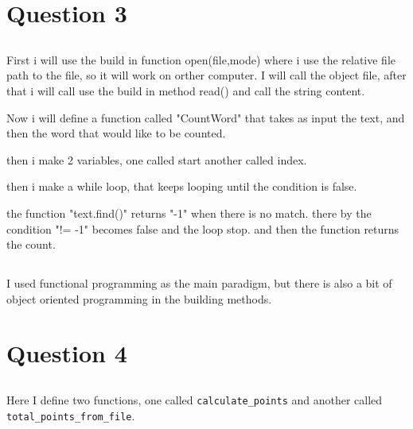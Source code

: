 \documentclass{article}
\begin{document}
\section{ Question 3}

\subsection{}

First i will use the build in function open(file,mode) where i use the relative file path to the file, so it will work on orther computer. I will call the object file, after that i will call use the build in method read() and call the string content.

Now i will define a function called "CountWord" that takes as input the text, and then the word that would like to be counted.

then i make 2 variables, one called start another called index. 

then i make a while loop, that keeps looping until the condition is false.

the function "text.find()" returns "-1" when there is no match. there by the condition "!= -1" becomes false and the loop stop.  and then the function returns the count.




\subsection{}


I used functional programming as the main paradigm, but there is also a bit of object oriented programming in the building methods. 


\subsection{}





\section{Question 4}
\subsection{}


Here I define two functions, one called \texttt{calculate\_points} and another called \texttt{total\_points\_from\_file}.
\end{document}
